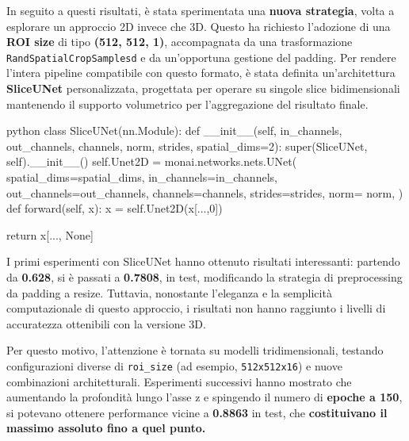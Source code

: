 
In seguito a questi risultati, è stata sperimentata una \textbf{nuova strategia}, volta a esplorare un approccio 2D invece che 3D. Questo ha richiesto l’adozione di una \textbf{ROI size} di tipo \textbf{(512, 512, 1)}, accompagnata da una trasformazione \texttt{RandSpatialCropSamplesd} e da un’opportuna gestione del padding. Per rendere l’intera pipeline compatibile con questo formato, è stata definita un’architettura \textbf{SliceUNet} personalizzata, progettata per operare su singole slice bidimensionali mantenendo il supporto volumetrico per l’aggregazione del risultato finale.

\begin{code}{python}
class SliceUNet(nn.Module):
    def __init__(self, in_channels, out_channels, 
                channels, norm, strides, spatial_dims=2):
        super(SliceUNet, self).__init__()
        self.Unet2D = monai.networks.nets.UNet(
            spatial_dims=spatial_dims,
            in_channels=in_channels,
            out_channels=out_channels,
            channels=channels,
            strides=strides,
            norm= norm,
        )
    def forward(self, x):
        x = self.Unet2D(x[...,0]) 

        return x[..., None]
\end{code}



I primi esperimenti con SliceUNet hanno ottenuto risultati interessanti: partendo da \textbf{0.628}, si è passati a \textbf{0.7808}, in test, modificando la strategia di preprocessing da padding a resize. Tuttavia, nonostante l’eleganza e la semplicità computazionale di questo approccio, i risultati non hanno raggiunto i livelli di accuratezza ottenibili con la versione 3D.


Per questo motivo, l’attenzione è tornata su modelli tridimensionali, testando configurazioni diverse di \texttt{roi\_size} (ad esempio, \texttt{512x512x16}) e nuove combinazioni architetturali. Esperimenti successivi hanno mostrato che aumentando la profondità lungo l’asse z e spingendo il numero di \textbf{epoche a 150}, si potevano ottenere performance vicine a \textbf{0.8863} in test, che \textbf{costituivano il massimo assoluto fino a quel punto.}

